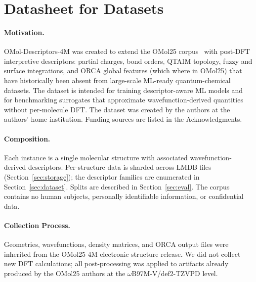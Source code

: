 \section{Datasheet for Datasets}
\label{app:datasheet}

\paragraph{Motivation.}
OMol-Descriptors-4M was created to extend the OMol25 corpus~\citep{levine2026openmolecules2025omol25} with
post-DFT interpretive descriptors: partial charges, bond orders, QTAIM
topology, fuzzy and surface integrations, and ORCA global features (which where in OMol25) that have
historically been absent from large-scale ML-ready quantum-chemical datasets.
The dataset is intended for training descriptor-aware ML models and for
benchmarking surrogates that approximate wavefunction-derived quantities
without per-molecule DFT.
The dataset was created by the authors at the authors' home institution.
Funding sources are listed in the Acknowledgments.

\paragraph{Composition.}
Each instance is a single molecular structure with associated wavefunction-derived
descriptors. 
Per-structure data is sharded across  LMDB files
(Section~\ref{sec:storage}); the descriptor families are enumerated in
Section~\ref{sec:dataset}. Splits are described in Section~\ref{sec:eval}.
The corpus contains no human subjects, personally identifiable information, or
confidential data.

\paragraph{Collection Process.}
Geometries, wavefunctions, density matrices, and ORCA output files were
inherited from the OMol25 4M electronic structure release. We did not collect new DFT calculations;
all post-processing was applied to artifacts already produced by the OMol25
authors at the $\omega$B97M-V/def2-TZVPD level.

